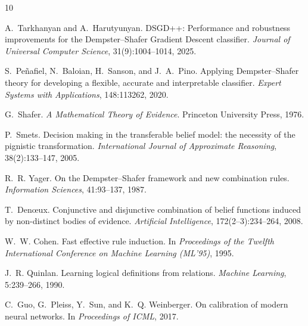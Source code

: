 \documentclass[11pt,a4paper]{article}
\providecommand{\1}{}
\renewcommand{\1}{\mathbbm{1}}
\begin{document}
\begin{thebibliography}{10}

A.~Tarkhanyan and A.~Harutyunyan.
\newblock DSGD++: Performance and robustness improvements for the Dempster--Shafer Gradient Descent classifier.
\newblock \emph{Journal of Universal Computer Science}, 31(9):1004--1014, 2025.

S.~Pe\~nafiel, N.~Baloian, H.~Sanson, and J.~A.~Pino.
\newblock Applying Dempster--Shafer theory for developing a flexible, accurate and interpretable classifier.
\newblock \emph{Expert Systems with Applications}, 148:113262, 2020.

G.~Shafer.
\newblock \emph{A Mathematical Theory of Evidence}.
\newblock Princeton University Press, 1976.

P.~Smets.
\newblock Decision making in the transferable belief model: the necessity of the pignistic transformation.
\newblock \emph{International Journal of Approximate Reasoning}, 38(2):133--147, 2005.

R.~R. Yager.
\newblock On the Dempster--Shafer framework and new combination rules.
\newblock \emph{Information Sciences}, 41:93--137, 1987.

T.~Den{\oe}ux.
\newblock Conjunctive and disjunctive combination of belief functions induced by non-distinct bodies of evidence.
\newblock \emph{Artificial Intelligence}, 172(2--3):234--264, 2008.

W.~W. Cohen.
\newblock Fast effective rule induction.
\newblock In \emph{Proceedings of the Twelfth International Conference on Machine Learning (ML'95)}, 1995.

J.~R. Quinlan.
\newblock Learning logical definitions from relations.
\newblock \emph{Machine Learning}, 5:239--266, 1990.

C.~Guo, G.~Pleiss, Y.~Sun, and K.~Q. Weinberger.
\newblock On calibration of modern neural networks.
\newblock In \emph{Proceedings of ICML}, 2017.

\end{thebibliography}
\end{document}

